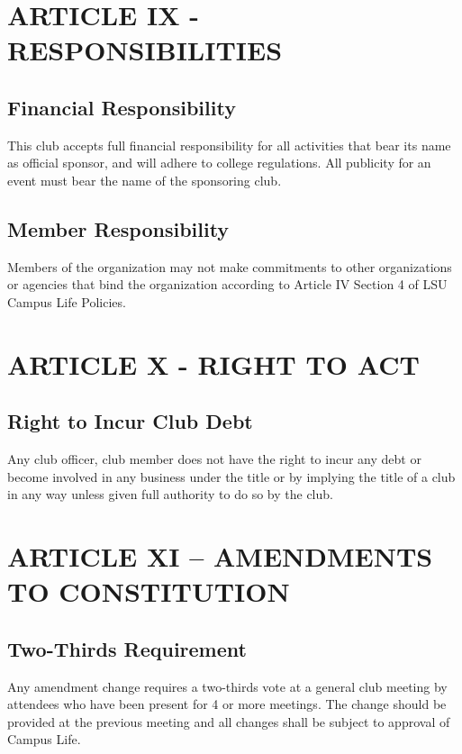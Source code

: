 \documentclass[11pt]{amsart}
\begin{document}
\section{ARTICLE IX - RESPONSIBILITIES}
\subsection{Financial Responsibility}
This club accepts full financial responsibility for all activities that bear its name as official sponsor, and will adhere to college regulations.  All publicity for an event must bear the name of the sponsoring club.
\subsection{Member Responsibility}
Members of the organization may not make commitments to other organizations or agencies that bind the organization according to Article IV Section 4 of LSU Campus Life Policies.

\section{ARTICLE X - RIGHT TO ACT}
\subsection{Right to Incur Club Debt}
Any club officer, club member does not have the right to incur any debt or become involved in any business under the title or by implying the title of a club in any way unless given full authority to do so by the club.

\section{ARTICLE XI – AMENDMENTS TO CONSTITUTION}
\subsection{Two-Thirds Requirement}
Any amendment change requires a two-thirds vote at a general club meeting by attendees who have been present for 4 or more meetings. The change should be provided at the previous meeting and all changes shall be subject to approval of Campus Life.

\end{document}
